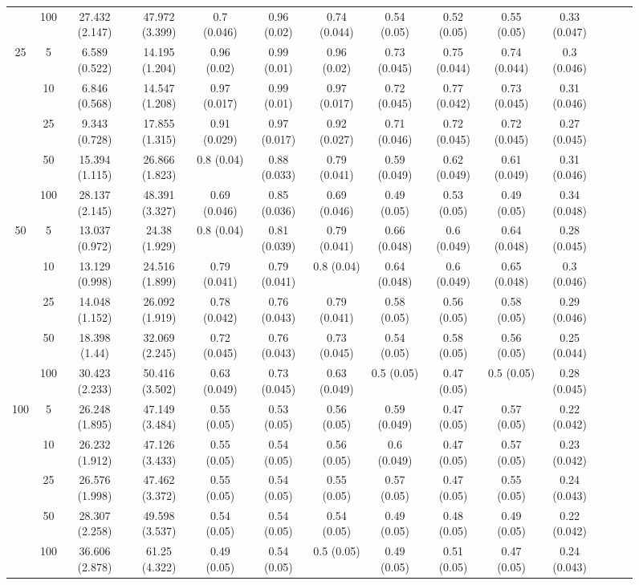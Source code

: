 \documentclass[10pt]{article}
\theoremstyle{definition}
\begin{document}
\begin{sidewaysfigure}
\begin{tabular}{cc|cc|ccc|ccc|ccc|c}
   & 100  & 27.432 (2.147) & 47.972 (3.399) & 0.7 (0.046) & 0.96 (0.02) & 0.74 (0.044) & 0.54 (0.05) & 0.52 (0.05) & 0.55 (0.05) & 0.33 (0.047) \\[.3cm] 
   \multirow{5}{*}{25}  & 5  & 6.589 (0.522) & 14.195 (1.204) & 0.96 (0.02) & 0.99 (0.01) & 0.96 (0.02) & 0.73 (0.045) & 0.75 (0.044) & 0.74 (0.044) & 0.3 (0.046) \\ 
  & 10  & 6.846 (0.568) & 14.547 (1.208) & 0.97 (0.017) & 0.99 (0.01) & 0.97 (0.017) & 0.72 (0.045) & 0.77 (0.042) & 0.73 (0.045) & 0.31 (0.046) \\ 
    & 25  & 9.343 (0.728) & 17.855 (1.315) & 0.91 (0.029) & 0.97 (0.017) & 0.92 (0.027) & 0.71 (0.046) & 0.72 (0.045) & 0.72 (0.045) & 0.27 (0.045) \\ 
    & 50  & 15.394 (1.115) & 26.866 (1.823) & 0.8 (0.04) & 0.88 (0.033) & 0.79 (0.041) & 0.59 (0.049) & 0.62 (0.049) & 0.61 (0.049) & 0.31 (0.046) \\ 
   & 100  & 28.137 (2.145) & 48.391 (3.327) & 0.69 (0.046) & 0.85 (0.036) & 0.69 (0.046) & 0.49 (0.05) & 0.53 (0.05) & 0.49 (0.05) & 0.34 (0.048) \\[.3cm] 
   \multirow{5}{*}{50}  & 5  & 13.037 (0.972) & 24.38 (1.929) & 0.8 (0.04) & 0.81 (0.039) & 0.79 (0.041) & 0.66 (0.048) & 0.6 (0.049) & 0.64 (0.048) & 0.28 (0.045) \\ 
   & 10  & 13.129 (0.998) & 24.516 (1.899) & 0.79 (0.041) & 0.79 (0.041) & 0.8 (0.04) & 0.64 (0.048) & 0.6 (0.049) & 0.65 (0.048) & 0.3 (0.046) \\ 
    & 25  & 14.048 (1.152) & 26.092 (1.919) & 0.78 (0.042) & 0.76 (0.043) & 0.79 (0.041) & 0.58 (0.05) & 0.56 (0.05) & 0.58 (0.05) & 0.29 (0.046) \\ 
    & 50  & 18.398 (1.44) & 32.069 (2.245) & 0.72 (0.045) & 0.76 (0.043) & 0.73 (0.045) & 0.54 (0.05) & 0.58 (0.05) & 0.56 (0.05) & 0.25 (0.044) \\ 
    & 100  & 30.423 (2.233) & 50.416 (3.502) & 0.63 (0.049) & 0.73 (0.045) & 0.63 (0.049) & 0.5 (0.05) & 0.47 (0.05) & 0.5 (0.05) & 0.28 (0.045) \\[.3cm] 
   \multirow{5}{*}{100}  & 5  & 26.248 (1.895) & 47.149 (3.484) & 0.55 (0.05) & 0.53 (0.05) & 0.56 (0.05) & 0.59 (0.049) & 0.47 (0.05) & 0.57 (0.05) & 0.22 (0.042) \\ 
    & 10  & 26.232 (1.912) & 47.126 (3.433) & 0.55 (0.05) & 0.54 (0.05) & 0.56 (0.05) & 0.6 (0.049) & 0.47 (0.05) & 0.57 (0.05) & 0.23 (0.042) \\ 
    & 25  & 26.576 (1.998) & 47.462 (3.372) & 0.55 (0.05) & 0.54 (0.05) & 0.55 (0.05) & 0.57 (0.05) & 0.47 (0.05) & 0.55 (0.05) & 0.24 (0.043) \\ 
   & 50  & 28.307 (2.258) & 49.598 (3.537) & 0.54 (0.05) & 0.54 (0.05) & 0.54 (0.05) & 0.49 (0.05) & 0.48 (0.05) & 0.49 (0.05) & 0.22 (0.042) \\ 
    & 100  & 36.606 (2.878) & 61.25 (4.322) & 0.49 (0.05) & 0.54 (0.05) & 0.5 (0.05) & 0.49 (0.05) & 0.51 (0.05) & 0.47 (0.05) & 0.24 (0.043) \\
\end{tabular}
\end{sidewaysfigure}
\end{document}
